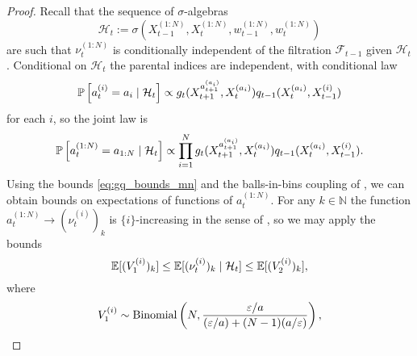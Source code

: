\begin{proof}
Recall that the sequence of $\sigma$-algebras
\begin{equation}\label{eq:defn_Ht}
\mathcal{H}_t := \sigma(X_{t-1}^{(1:N)}, X_t^{(1:N)}, w_{t-1}^{(1:N)}, w_t^{(1:N)} )
\end{equation}
are such that $\nu_t^{(1:N)}$ is conditionally independent of the filtration $\mathcal{F}_{t-1}$ given $\mathcal{H}_t$.
Conditional on $\mathcal{H}_t$ the parental indices are independent, with conditional law
\begin{equation}\label{eq:parentslaw_mn}
\mathbb{P} \left[ a_t^{(i)} = a_i \mid \mathcal{H}_t \right] 
\propto g_t( X_{t+1}^{a_{t+1}^{(a_i)}} , X_t^{(a_i)} ) q_{t-1}(X_t^{(a_i)}, X_{t-1}^{(i)})
\end{equation}
for each $i$, so the joint law is
\begin{equation*}
\mathbb{P} \left[ a_t^{(1:N)} = a_{1:N} \mid \mathcal{H}_t \right] 
\propto \prod_{i=1}^N g_t( X_{t+1}^{a_{t+1}^{(a_i)}} , X_t^{(a_i)} ) 
        q_{t-1}(X_t^{(a_i)}, X_{t-1}^{(i)}).
\end{equation*}
%
%
Using the bounds \eqref{eq:gq_bounds_mn} and the balls-in-bins coupling of \textcite[Proof of Lemma 3]{koskela2018}, we can obtain bounds on expectations of functions of $a_t^{(1:N)}$.
For any $k\in\mathbb{N}$ the function $a_t^{(1:N)} \to (\nu_t^{(i)})_k$ is $\{i\}$-increasing in the sense of \textcite{koskela2018}, so we may apply the bounds
\begin{equation*}
\mathbb{E}[ (V_1^{(i)})_k ]
\leq \mathbb{E}[ (\nu_t^{(i)})_k \mid \mathcal{H}_t ]
\leq \mathbb{E}[ (V_2^{(i)})_k ] ,
\end{equation*}
where
\begin{align*}
& V_1^{(i)} 
\sim \Bin\left(N, \frac{\varepsilon/a}{(\varepsilon/a) + (N-1)(a/\varepsilon)} \right),\\

\end{align*}
\end{proof}
